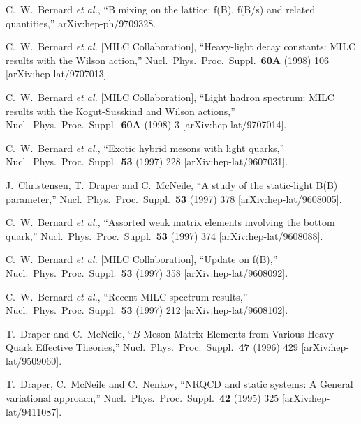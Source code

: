 \begin{thebibliography}{130}
C.~W.~Bernard {\it et al.},
``B mixing on the lattice: f(B), f(B/s) and related quantities,''
arXiv:hep-ph/9709328.

C.~W.~Bernard {\it et al.}  [MILC Collaboration],
``Heavy-light decay constants: MILC results with the Wilson action,''
Nucl.\ Phys.\ Proc.\ Suppl.\  {\bf 60A} (1998) 106
[arXiv:hep-lat/9707013].

C.~W.~Bernard {\it et al.}  [MILC Collaboration],
``Light hadron spectrum: MILC results with the Kogut-Susskind and Wilson  actions,''
Nucl.\ Phys.\ Proc.\ Suppl.\  {\bf 60A} (1998) 3
[arXiv:hep-lat/9707014].


C.~W.~Bernard {\it et al.},
``Exotic hybrid mesons with light quarks,''
Nucl.\ Phys.\ Proc.\ Suppl.\  {\bf 53} (1997) 228
[arXiv:hep-lat/9607031].


J.~Christensen, T.~Draper and C.~McNeile,
``A study of the static-light B(B) parameter,''
Nucl.\ Phys.\ Proc.\ Suppl.\  {\bf 53} (1997) 378
[arXiv:hep-lat/9608005].

C.~W.~Bernard {\it et al.},
``Assorted weak matrix elements involving the bottom quark,''
Nucl.\ Phys.\ Proc.\ Suppl.\  {\bf 53} (1997) 374
[arXiv:hep-lat/9608088].

C.~W.~Bernard {\it et al.}  [MILC Collaboration],
``Update on f(B),''
Nucl.\ Phys.\ Proc.\ Suppl.\  {\bf 53} (1997) 358
[arXiv:hep-lat/9608092].

C.~W.~Bernard {\it et al.},
``Recent MILC spectrum results,''
Nucl.\ Phys.\ Proc.\ Suppl.\  {\bf 53} (1997) 212
[arXiv:hep-lat/9608102].

T.~Draper and C.~McNeile,
``$B$ Meson Matrix Elements from Various Heavy Quark Effective Theories,''
Nucl.\ Phys.\ Proc.\ Suppl.\  {\bf 47} (1996) 429
[arXiv:hep-lat/9509060].

T.~Draper, C.~McNeile and C.~Nenkov,
``NRQCD and static systems: A General variational approach,''
Nucl.\ Phys.\ Proc.\ Suppl.\  {\bf 42} (1995) 325
[arXiv:hep-lat/9411087].


\end{thebibliography}
